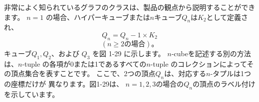 
非常によく知られているグラフのクラスは、製品の観点から説明することができます。
$n=1$ の場合、ハイパーキューブまたは$n$キューブ$Q_n$は$K_2$として定義され、
$$Q_n = Q_n-1 \times K_2$$ $$(n \geq 2 の場合)。$$
キューブ$Q_1, Q_2$、および $Q_3$ を図 1-29 に示します。
$n$-cubeを記述する別の方法は、$n$-tuple
の各項が0または1であるすべての$n$-tuple
のコレクションによってその頂点集合を表すことです。
ここで、2つの頂点$Q_n$は、対応する$n$-タプルは1つの座標だけが
異なります。図1-29は、
$n = 1, 2, 3$の場合の$Q_n$の頂点のラベル付けを示しています。